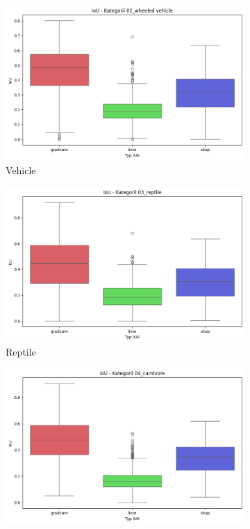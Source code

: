 \begin{figure}[h]
\begin{subfigure}[b]{0.3\textwidth}
		\centering\includegraphics[width=.9\textwidth]{img/base_iou_vehicle}
		\caption{Vehicle}
	\end{subfigure}
	\begin{subfigure}[b]{0.3\textwidth}
		\centering\includegraphics[width=.9\textwidth]{img/base_iou_reptile}
		\caption{Reptile}
	\end{subfigure}
	\begin{subfigure}[b]{0.3\textwidth}
		\centering\includegraphics[width=.9\textwidth]{img/base_iou_carnivore}

\end{subfigure}
\end{figure}
